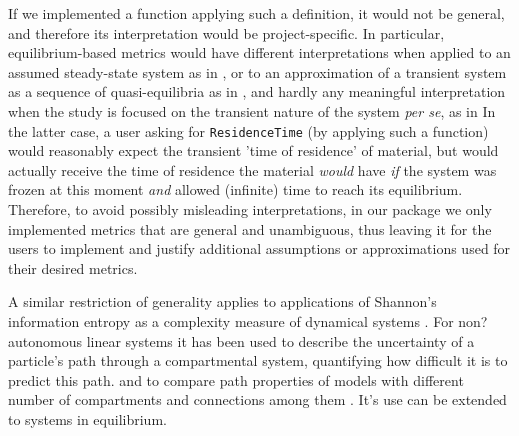 If we implemented a function applying such a definition, it would not be general, and therefore its interpretation would be project-specific.
In particular, equilibrium-based metrics would have different interpretations when applied to an assumed steady-state system as in \cite{Xia2013GCB}, or to an approximation of a transient system as a sequence of quasi-equilibria as in
\cite{Koven2015Biogeosciences, osullivan_process-oriented_2022}, and hardly any meaningful interpretation when the study is focused on the transient nature of the system \textit{per se}, as in \cite{Luo2017Biogeosciences} 
In the latter case, a user asking for \texttt{ResidenceTime} (by applying such a function) would reasonably expect the transient 'time of residence' of material, but would actually receive the time of residence the material  
\emph{would} have \emph{if} the system was frozen at this moment \emph{and} allowed (infinite) time to reach its equilibrium. Therefore, to avoid possibly misleading interpretations, in our package we only implemented metrics 
that are general and unambiguous, thus leaving it for the users to implement and justify additional assumptions or approximations used for their desired metrics. 

A similar restriction of generality applies to applications of Shannon's information entropy as a complexity measure 
of dynamical systems \cite{Ebeling1998}. 
For 
non? 
autonomous linear systems it has 
been used to describe the uncertainty of a particle's path through a
compartmental system, quantifying how difficult it is to predict this path. 
and to compare path properties of models with different number of
compartments and connections among them \cite{Metzler2020}. 
It's use can be extended to systems in equilibrium.

